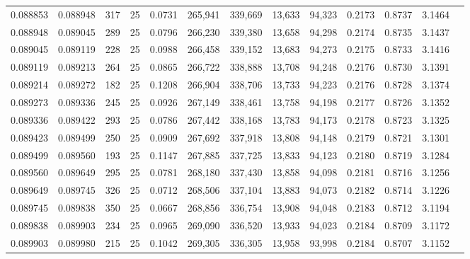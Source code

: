 \begin{tabular}{rrrrrrrrrrrrr}
0.088853 & 0.088948 &   317 &  25 &                                     0.0731 & 265,941 & 339,669 &  13,633 &  94,323 & 0.2173 & 0.8737 & 3.1464 \\
0.088948 & 0.089045 &   289 &  25 &                                     0.0796 & 266,230 & 339,380 &  13,658 &  94,298 & 0.2174 & 0.8735 & 3.1437 \\
0.089045 & 0.089119 &   228 &  25 &                                     0.0988 & 266,458 & 339,152 &  13,683 &  94,273 & 0.2175 & 0.8733 & 3.1416 \\
0.089119 & 0.089213 &   264 &  25 &                                     0.0865 & 266,722 & 338,888 &  13,708 &  94,248 & 0.2176 & 0.8730 & 3.1391 \\
0.089214 & 0.089272 &   182 &  25 &                                     0.1208 & 266,904 & 338,706 &  13,733 &  94,223 & 0.2176 & 0.8728 & 3.1374 \\
0.089273 & 0.089336 &   245 &  25 &                                     0.0926 & 267,149 & 338,461 &  13,758 &  94,198 & 0.2177 & 0.8726 & 3.1352 \\
0.089336 & 0.089422 &   293 &  25 &                                     0.0786 & 267,442 & 338,168 &  13,783 &  94,173 & 0.2178 & 0.8723 & 3.1325 \\
0.089423 & 0.089499 &   250 &  25 &                                     0.0909 & 267,692 & 337,918 &  13,808 &  94,148 & 0.2179 & 0.8721 & 3.1301 \\
0.089499 & 0.089560 &   193 &  25 &                                     0.1147 & 267,885 & 337,725 &  13,833 &  94,123 & 0.2180 & 0.8719 & 3.1284 \\
0.089560 & 0.089649 &   295 &  25 &                                     0.0781 & 268,180 & 337,430 &  13,858 &  94,098 & 0.2181 & 0.8716 & 3.1256 \\
0.089649 & 0.089745 &   326 &  25 &                                     0.0712 & 268,506 & 337,104 &  13,883 &  94,073 & 0.2182 & 0.8714 & 3.1226 \\
0.089745 & 0.089838 &   350 &  25 &                                     0.0667 & 268,856 & 336,754 &  13,908 &  94,048 & 0.2183 & 0.8712 & 3.1194 \\
0.089838 & 0.089903 &   234 &  25 &                                     0.0965 & 269,090 & 336,520 &  13,933 &  94,023 & 0.2184 & 0.8709 & 3.1172 \\
0.089903 & 0.089980 &   215 &  25 &                                     0.1042 & 269,305 & 336,305 &  13,958 &  93,998 & 0.2184 & 0.8707 & 3.1152 \\

\end{tabular}
